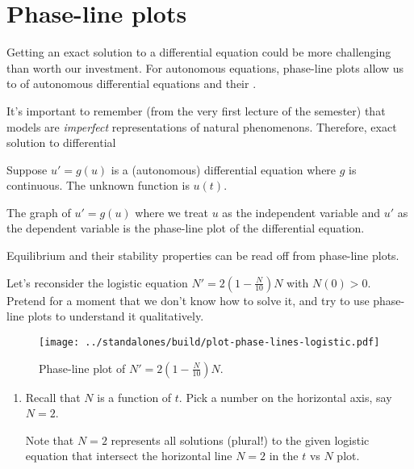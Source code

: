 \documentclass[../main.tex]{subfiles}
\begin{document}
 \section{Phase-line plots}

Getting an exact solution to a differential equation could be more challenging than worth our investment.  For autonomous equations, phase-line plots allow us to   of autonomous differential equations and their . 

It's important to remember (from the very first lecture of the semester) that models are \emph{imperfect} representations of natural phenomenons. Therefore, exact solution to differential 

\begin{definition}
  Suppose \(u' = g(u)\) is a (autonomous) differential equation where \(g\) is continuous. The unknown function is \(u(t)\). 

  The graph of \(u' = g(u)\) where we treat \(u\) as the independent variable and \(u'\) as the dependent variable is the phase-line plot of the differential equation.
\end{definition}

\faStar{} Equilibrium and their stability properties can be read off from phase-line plots. 

\begin{example}
  Let's reconsider the logistic equation \(N' = 2\left(1 - \frac{N}{10}\right)N\) with \(N(0) > 0\). Pretend for a moment that we don't know how to solve it, and try to use phase-line plots to understand it qualitatively.

  \begin{figure}[H] %
    \centering
    \texttt{[image: ../standalones/build/plot-phase-lines-logistic.pdf]}
    \caption{Phase-line plot of \(N' = 2\left(1-\frac{N}{10}\right)N\).}
    \label{fig:phase-lines-logistic}
  \end{figure}

  \begin{enumerate}
    \item Recall that \(N\) is a function of \(t\). Pick a number on the horizontal axis, say \(N = 2\). 

      Note that \(N = 2\) represents all solutions (plural!) to the given logistic equation that intersect the horizontal line \(N = 2\) in the \(t\) vs \(N\) plot.
  \end{enumerate}
\end{example}
\end{document}
